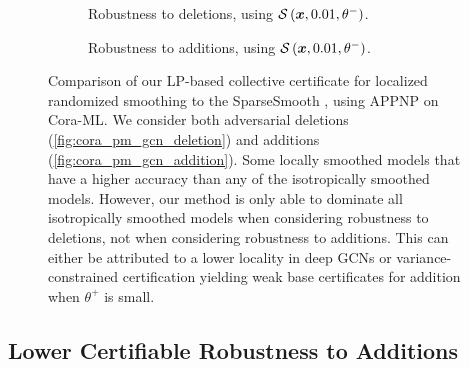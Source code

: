 \begin{figure}
    \vskip 0.2in
    \centering
    \begin{subfigure}[b]{0.49\textwidth}
        \resizebox{\textwidth}{!}{}
        \caption{
        Robustness to deletions, using $\mathcal{S}\left({\bm{x}}, 0.01, \theta^{-}\right)$.
        }
        \label{fig:cora_pm_gcn_deletion}
    \end{subfigure}
    \hfill
    \begin{subfigure}[b]{0.49\textwidth}
        \resizebox{\textwidth}{!}{}
        \caption{
        Robustness to additions, using $\mathcal{S}\left({\bm{x}}, 0.01, \theta^{-}\right)$.
        }
        \label{fig:cora_pm_gcn_addition}
    \end{subfigure}
    \caption{Comparison of our LP-based collective certificate for localized randomized smoothing to the SparseSmooth \citep{Bojchevski2020}, using APPNP on Cora-ML. We consider both adversarial deletions (\autoref{fig:cora_pm_gcn_deletion}) and additions (\autoref{fig:cora_pm_gcn_addition}).
    Some locally smoothed models that have a higher accuracy than any of the isotropically smoothed models. However, our method is only able to dominate all isotropically smoothed models when considering robustness to deletions, not when considering robustness to additions.
    This can either be attributed to a lower locality in deep GCNs or variance-constrained certification yielding weak base certificates for addition when $\theta^{+}$ is small.}
    \label{fig:cora_pm_gcn}
    \vskip -0.2in
\end{figure}

\subsection{Lower Certifiable Robustness to Additions}\label{section:lower_cert_additions}

